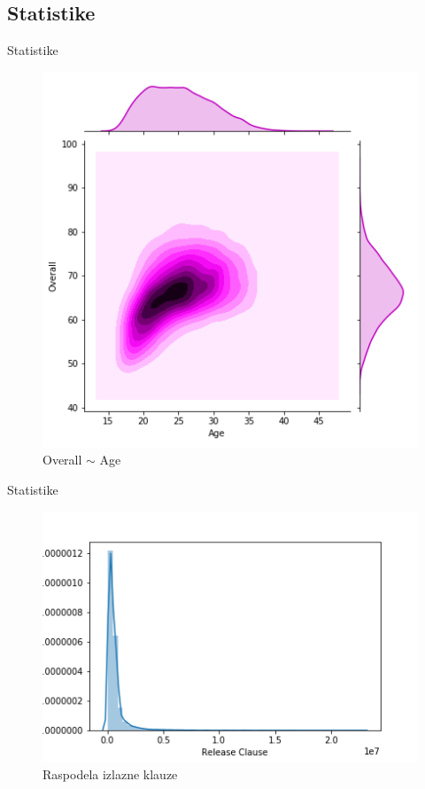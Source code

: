 \documentclass[12pt]{beamer}
\begin{document}
\subsection{Statistike}
\begin{frame}{Statistike}
\begin{figure}
\includegraphics[scale=0.4]{../stat1}
\caption{Overall $\sim$ Age}
\end{figure}
\end{frame}

\begin{frame}{Statistike}
\begin{figure}
\includegraphics[scale=0.4]{../stat2}
\caption{Raspodela izlazne klauze}
\end{figure}
\end{frame}
\end{document}
